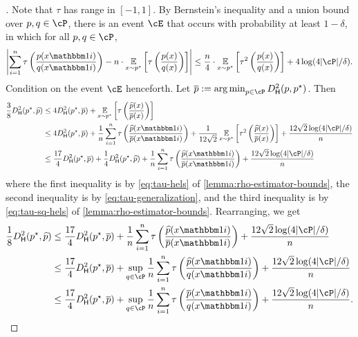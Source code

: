 \begin{proof}[]
Note that $\tau$ has range in $[-1,1]$. By Bernstein's inequality and a union bound over $p,q \in \cP$, there is an event $\cE$ that occurs with probability at least $1-\delta$, in which for all $p,q \in \cP$,
\begin{equation}\left| \sum_{i=1}^n \tau\left(\frac{p(x\ind{i})}{q(x\ind{i})}
\right) - n \cdot \EE_{x \sim \pstar}\left[\tau\left(\frac{p(x)}{q(x)}\right)\right]\right| \leq \frac{n}{4} \cdot \EE_{x \sim \pstar}\left[\tau^2\left(\frac{p(x)}{q(x)}\right)\right] + 4\log(4|\cP|/\delta).\label{eq:tau-generalization}\end{equation}
Condition on the event $\cE$ henceforth. Let $\pbar := \argmin_{p \in \cP} \Dhels{p}{\pstar}$. Then
\begin{align}
\frac{3}{8}\Dhels{\pstar}{\phat}
&\leq 4\Dhels{\pstar}{\pbar} + \EE_{x \sim \pstar}\left[\tau\left(\frac{\phat(x)}{\pbar(x)}\right)\right] \\ 
&\leq 4\Dhels{\pstar}{\pbar} + \frac{1}{n} \sum_{i=1}^n\tau\left(\frac{\phat(x\ind{i})}{\pbar(x\ind{i})}\right) + \frac{1}{12\sqrt{2}} \EE_{x \sim \pstar}\left[\tau^2\left(\frac{\phat(x)}{\pbar(x)}\right)\right] + \frac{12\sqrt{2}\log(4|\cP|/\delta)}{n} \\ 
&\leq \frac{17}{4}\Dhels{\pstar}{\pbar} + \frac{1}{4}\Dhels{\pstar}{\phat} + \frac{1}{n}\sum_{i=1}^n\tau\left(\frac{\phat(x\ind{i})}{\pbar(x\ind{i})}\right) + \frac{12\sqrt{2}\log(4|\cP|/\delta)}{n}
\end{align}
where the first inequality is by \cref{eq:tau-hels} of \cref{lemma:rho-estimator-bounds}, the second inequality is by \cref{eq:tau-generalization}, and the third inequality is by \cref{eq:tau-sq-hels} of \cref{lemma:rho-estimator-bounds}. Rearranging, we get
\begin{align}
\frac{1}{8}\Dhels{\pstar}{\phat}
&\leq \frac{17}{4}\Dhels{\pstar}{\pbar} + \frac{1}{n}\sum_{i=1}^n\tau\left(\frac{\phat(x\ind{i})}{\pbar(x\ind{i})}\right) + \frac{12\sqrt{2}\log(4|\cP|/\delta)}{n} \\ 
&\leq \frac{17}{4}\Dhels{\pstar}{\pbar} + \sup_{q \in \cP} \frac{1}{n}\sum_{i=1}^n\tau\left(\frac{\phat(x\ind{i})}{q(x\ind{i})}\right) + \frac{12\sqrt{2}\log(4|\cP|/\delta)}{n} \\ 
&\leq \frac{17}{4}\Dhels{\pstar}{\pbar} + \sup_{q \in \cP} \frac{1}{n}\sum_{i=1}^n\tau\left(\frac{\pbar(x\ind{i})}{q(x\ind{i})}\right) + \frac{12\sqrt{2}\log(4|\cP|/\delta)}{n}.\label{eq:rho-hels-intermediate}
\end{align}

\end{proof}
